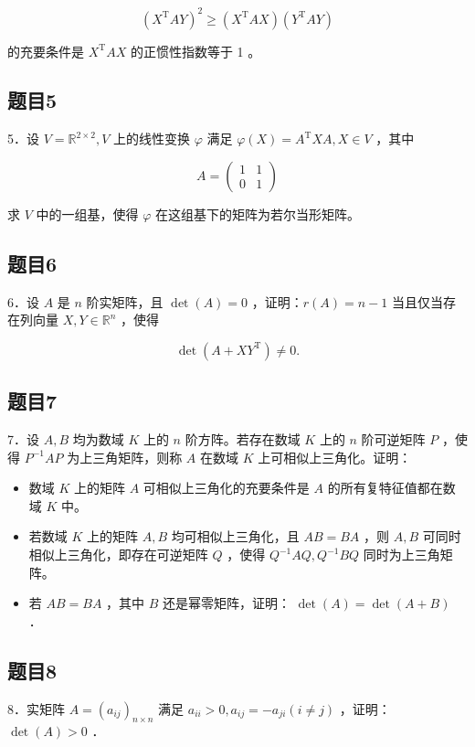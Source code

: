 \documentclass{article}
\begin{document}
\[
\left(X^{\mathrm{T}} A Y\right)^{2} \geq\left(X^{\mathrm{T}} A X\right)\left(Y^{\mathrm{T}} A Y\right)
\]

的充要条件是 \(X^{\mathrm{T}} A X\) 的正惯性指数等于 1 。

\subsection{题目5}
5．设 \(V=\mathbb{R}^{2 \times 2}, V\) 上的线性变换 \(\varphi\) 满足 \(\varphi(X)=A^{\mathrm{T}} X A, X \in V\) ，其中

\[
A=\left(\begin{array}{ll}
1 & 1 \\
0 & 1
\end{array}\right)
\]

求 \(V\) 中的一组基，使得 \(\varphi\) 在这组基下的矩阵为若尔当形矩阵。

\subsection{题目6}
6．设 \(A\) 是 \(n\) 阶实矩阵，且 \(\operatorname{det}(A)=0\) ，证明：\(r(A)=n-1\) 当且仅当存在列向量 \(X, Y \in \mathbb{R}^{n}\) ，使得

\[
\operatorname{det}\left(A+X Y^{\mathrm{T}}\right) \neq 0 .
\]

\subsection{题目7}
7．设 \(A, B\) 均为数域 \(K\) 上的 \(n\) 阶方阵。若存在数域 \(K\) 上的 \(n\) 阶可逆矩阵 \(P\) ，使得 \(P^{-1} A P\) 为上三角矩阵，则称 \(A\) 在数域 \(K\) 上可相似上三角化。证明：

\begin{itemize}
  \item[（1）] 数域 \(K\) 上的矩阵 \(A\) 可相似上三角化的充要条件是 \(A\) 的所有复特征值都在数域 \(K\) 中。
  \item[（2）] 若数域 \(K\) 上的矩阵 \(A, B\) 均可相似上三角化，且 \(A B=B A\) ，则 \(A, B\) 可同时相似上三角化，即存在可逆矩阵 \(Q\) ，使得 \(Q^{-1} A Q, Q^{-1} B Q\) 同时为上三角矩阵。
  \item[（3）] 若 \(A B=B A\) ，其中 \(B\) 还是幂零矩阵，证明： \(\operatorname{det}(A)=\operatorname{det}(A+B)\) ．
\end{itemize}

\subsection{题目8}
8．实矩阵 \(A=\left(a_{i j}\right)_{n \times n}\) 满足 \(a_{i i}>0, a_{i j}=-a_{j i}(i \neq j)\) ，证明： \(\operatorname{det}(A)>0\) ．
\end{document}
